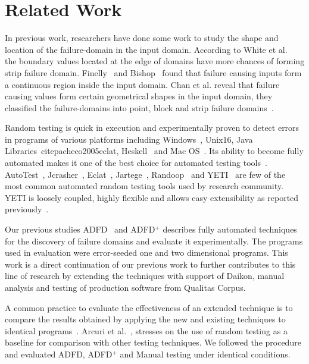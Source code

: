 \section{Related Work}
In previous work, researchers have done some work to study the shape and location of the failure-domain in the input domain. According to White et al.~\cite{white1980domain} the boundary values located at the edge of domains have more chances of forming strip failure domain. Finelly~\cite{finelli1991nasa} and Bishop~\cite{bishop1993variation} found that failure causing inputs form a continuous region inside the input domain. Chan et al. reveal that failure causing values form certain geometrical shapes in the input domain, they classified the failure-domains into point, block and strip failure domains~\cite{chan1996proportional}. 

Random testing is quick in execution and experimentally proven to detect errors in programs of various platforms including Windows~\cite{forrester2000empirical}, Unix{16}, Java Libraries~cite{pacheco2005eclat}, Heskell~\cite{claessen2011quickcheck} and Mac OS~\cite{miller2006empirical}.  Its ability to become fully automated makes it one of the best choice for automated testing tools~\cite{csallner2004jcrasher, pacheco2005eclat}. AutoTest~\cite{ciupa2008predictability}, Jcrasher~\cite{csallner2004jcrasher}, Eclat~\cite{pacheco2005eclat}, Jartege~\cite{oriat2005jartege}, Randoop~\cite{pacheco2007randoop} and YETI~\cite{oriol2012random, ahmad2013adfd, ahmad2014adfd2} are few of the most common automated random testing tools used by research community. YETI is loosely coupled, highly flexible and allows easy extensibility as reported previously~\cite{oriol2010testing}. 

Our previous studies ADFD~\cite{ahmad2013adfd} and ADFD$^+$ \cite{ahmad2014adfd2} describes fully automated techniques for the discovery of failure domains and evaluate it experimentally. The programs used in evaluation were error-seeded one and two dimensional programs. This work is a direct continuation of our previous work to further contributes to this line of research by extending the techniques with support of Daikon, manual analysis and testing of production software from Qualitas Corpus.

A common practice to evaluate the effectiveness of an extended technique is to compare the results obtained by applying the new and existing techniques to identical programs~\cite{duran1984evaluation, gutjahr1999partition}. Arcuri et al.~\cite{arcuri2012random}, stresses on the use of random testing as a baseline for comparison with other testing techniques. We followed the procedure and evaluated ADFD, ADFD$^+$ and Manual testing under identical conditions.


